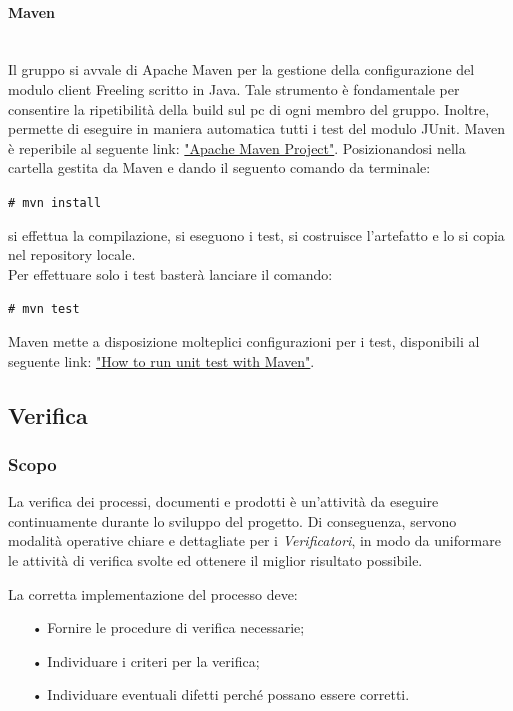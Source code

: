 {\paragraph{Maven}\mbox{}\\
Il gruppo \gruppo  si avvale di Apache Maven per la gestione della configurazione del modulo client Freeling scritto in Java. Tale strumento è fondamentale per consentire la ripetibilità della build sul pc di ogni membro del gruppo. Inoltre, permette di eseguire in maniera automatica tutti i test del modulo JUnit. Maven è reperibile al seguente link: \href{https://maven.apache.org/}{"Apache Maven Project"}. 
Posizionandosi nella cartella gestita da Maven e dando il seguento comando da terminale: 
\begin{center}
\texttt{\# mvn install}
\end{center}
si effettua la compilazione, si eseguono i test, si costruisce l’artefatto e lo si copia nel
repository locale.
\\
Per effettuare solo i test basterà lanciare il comando: 
\begin{center}
\texttt{\# mvn test}
\end{center} 
Maven mette a disposizione molteplici configurazioni per i test, disponibili al seguente link: 
\href{https://www.mkyong.com/maven/how-to-run-unit-test-with-maven/}{"How to run unit test with Maven"}.

\subsection{Verifica}

\subsubsection{Scopo}

La verifica dei processi, documenti e prodotti è un'attività da eseguire continuamente durante lo sviluppo del progetto. Di conseguenza, servono modalità operative chiare e dettagliate per i \textit{Verificatori}, in modo da uniformare le attività di verifica svolte ed ottenere il miglior risultato possibile. 

La corretta implementazione del processo deve:
\begin{itemize}
\item[•] Fornire le procedure di verifica necessarie; 
\item[•] Individuare i criteri per la verifica; 
\item[•] Individuare eventuali difetti perché possano essere corretti.
\end{itemize}

}
